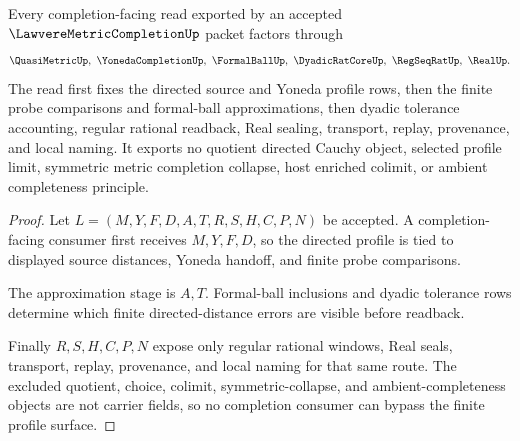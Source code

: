 \begin{theorem}
\label{thm:lawvere-metric-completion-finite-profile-nonescape}
Every completion-facing read exported by an accepted $\LawvereMetricCompletionUp$ packet factors through
$$
\QuasiMetricUp,\ \YonedaCompletionUp,\ \FormalBallUp,\ \DyadicRatCoreUp,\ \RegSeqRatUp,\ \RealUp .
$$
The read first fixes the directed source and Yoneda profile rows, then the finite probe comparisons and formal-ball approximations, then dyadic tolerance accounting, regular rational readback, Real sealing, transport, replay, provenance, and local naming. It exports no quotient directed Cauchy object, selected profile limit, symmetric metric completion collapse, host enriched colimit, or ambient completeness principle.
\end{theorem}
\begin{proof}
Let $L=(M,Y,F,D,A,T,R,S,H,C,P,N)$ be accepted. A completion-facing consumer first receives $M,Y,F,D$, so the directed profile is tied to displayed source distances, Yoneda handoff, and finite probe comparisons.

The approximation stage is $A,T$. Formal-ball inclusions and dyadic tolerance rows determine which finite directed-distance errors are visible before readback.

Finally $R,S,H,C,P,N$ expose only regular rational windows, Real seals, transport, replay, provenance, and local naming for that same route. The excluded quotient, choice, colimit, symmetric-collapse, and ambient-completeness objects are not carrier fields, so no completion consumer can bypass the finite profile surface.
\end{proof}

